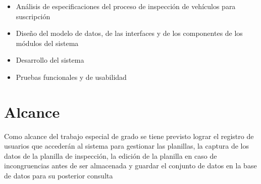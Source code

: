 \begin{itemize}

	
	





   \item Análisis de especificaciones del proceso de inspección de vehículos para suscripción

   \item Diseño del modelo de datos, de las interfaces y de los componentes de los módulos del sistema

   \item Desarrollo del sistema

   \item Pruebas funcionales y de usabilidad
	
	

\end{itemize}





\section{Alcance}

Como alcance del trabajo especial de grado se tiene previsto lograr el registro de usuarios que accederán al sistema para gestionar las planillas, la captura de los datos de la planilla de inspección, la edición de la planilla en caso de incongruencias antes de ser almacenada y guardar el conjunto de datos en la base de datos para su posterior consulta

